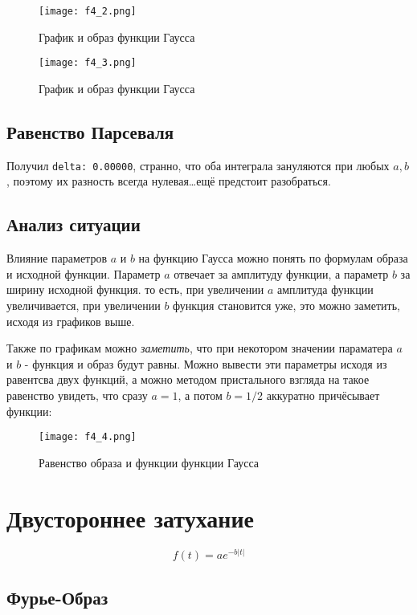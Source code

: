 \begin{figure}[ht]
    \centering
    \texttt{[image: f4\_2.png]}
    \caption{График и образ функции Гаусса}
\end{figure}

\begin{figure}[ht]
    \centering
    \texttt{[image: f4\_3.png]}
    \caption{График и образ функции Гаусса}
\end{figure}

\newpage

\subsection{Равенство Парсеваля}

Получил \texttt{delta: 0.00000}, странно, что оба интеграла зануляются при любых $a,b$, поэтому их разность всегда нулевая\dots ещё предстоит разобраться.

\subsection{Анализ ситуации}

Влияние параметров $a$ и $b$ на функцию Гаусса можно понять по формулам образа и исходной функции.
Параметр $a$ отвечает за амплитуду функции, а параметр $b$ за ширину исходной функция.
то есть, при увеличении $a$ амплитуда функции увеличивается, при увеличении $b$ функция становится
уже, это можно заметить, исходя из графиков выше.

Также по графикам можно \textit{заметить}, что при некотором значении параматера $a$ и $b$ - функция и образ будут равны. Можно вывести эти параметры исходя из равентсва двух функций, 
а можно методом пристального взгляда на такое равенство увидеть, что сразу $a=1$, а потом  $b=1/2$ аккуратно причёсывает функции:

\begin{figure}[ht]
    \centering
    \texttt{[image: f4\_4.png]}
    \caption{Равенство образа и функции функции Гаусса}
\end{figure}

\section{Двустороннее затухание}
$$
f(t) = ae^{-b|t|}
$$


\subsection{Фурье-Образ}

